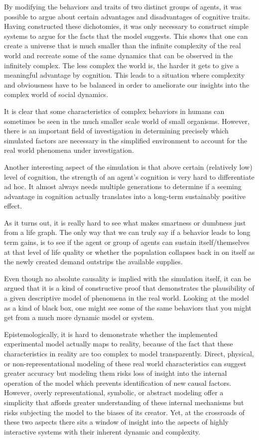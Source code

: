 By modifying the behaviors and traits of two distinct groups of agents, it was possible to argue about certain advantages and disadvantages of cognitive traits. Having constructed these dichotomies, it was only necessary to construct simple systems to argue for the facts that the model suggests. This shows that one can create a universe that is much smaller than the infinite complexity of the real world and recreate some of the same dynamics that can be observed in the infinitely complex. The less complex the world is, the harder it gets to give a meaningful advantage by cognition. This leads to a situation where complexity and obviousness have to be balanced in order to ameliorate our insights into the complex world of social dynamics.

It is clear that some characteristics of complex behaviors in humans can sometimes be seen in the much smaller scale world of small organisms. However, there is an important field of investigation in determining precisely which simulated factors are necessary in the simplified environment to account for the real world phenomena under investigation.

Another interesting aspect of the simulation is that above certain (relatively low) level of cognition, the strength of an agent's cognition is very hard to differentiate ad hoc. It almost always needs multiple generations to determine if a seeming advantage in cognition actually translates into a long-term sustainably positive effect.

As it turns out, it is really hard to see what makes smartness or dumbness just from a life graph. The only way that we can truly say if a behavior leads to long term gains, is to see if the agent or group of agents can sustain itself/themselves at that level of life quality or whether the population collapses back in on itself as the newly created demand outstrips the available supplies.

Even though no absolute causality is implied with the simulation itself, it can be argued that it is a kind of constructive proof that demonstrates the plausibility of a given descriptive model of phenomena in the real world. Looking at the model as a kind of black box, one might see some of the same behaviors that you might get from a much more dynamic model or system. 

Epistemologically, it is hard to demonstrate whether the implemented experimental model actually maps to reality, because of the fact that these characteristics in reality are too complex to model transparently. Direct, physical, or non-representational modeling of these real world characteristics can suggest greater accuracy but modeling them risks loss of insight into the internal operation of the model which prevents identification of new causal factors. However, overly representational, symbolic, or abstract modeling offer a simplicity that affords greater understanding of these internal mechanisms but risks subjecting the model to the biases of its creator. Yet, at the crossroads of these two aspects there sits a window of insight into the aspects of highly interactive systems with their inherent dynamic and complexity.

